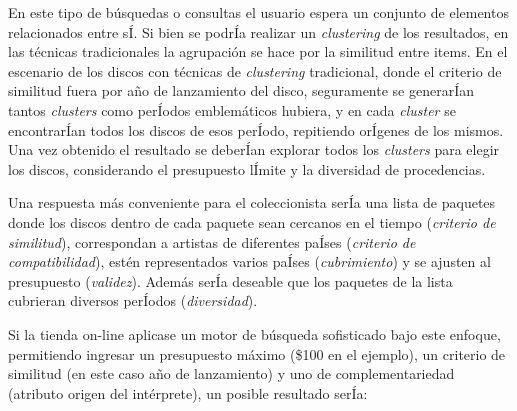 En este tipo de búsquedas o consultas el usuario espera un conjunto de elementos relacionados entre sÍ. Si bien se podrÍa realizar un {\em clustering} de los resultados, en las técnicas tradicionales la agrupación se hace por la similitud entre items. En el escenario de los discos con técnicas de {\em clustering} tradicional, donde el criterio de similitud fuera por año de lanzamiento del disco, seguramente se generarÍan tantos {\em clusters} como perÍodos emblemáticos hubiera, y en cada {\em cluster} se encontrarÍan todos los discos de esos perÍodo, repitiendo orÍgenes de los mismos. Una vez obtenido el resultado se deberÍan explorar todos los {\em clusters} para elegir los discos, considerando el presupuesto lÍmite y la diversidad de procedencias.

Una respuesta más conveniente para el coleccionista serÍa una lista de paquetes donde los discos dentro de cada paquete sean cercanos en el tiempo ({\em criterio de similitud}), correspondan a artistas de diferentes paÍses ({\em criterio de compatibilidad}), estén representados varios paÍses ({\em cubrimiento}) y se ajusten al presupuesto ({\em validez}). Además serÍa deseable que los paquetes de la lista cubrieran diversos perÍodos ({\em diversidad}).

Si la tienda on-line aplicase un motor de búsqueda sofisticado bajo este enfoque, permitiendo ingresar un presupuesto máximo (\$100 en el ejemplo), un criterio de similitud (en este caso año de lanzamiento) y uno de complementariedad (atributo origen del intérprete), un posible resultado serÍa:

